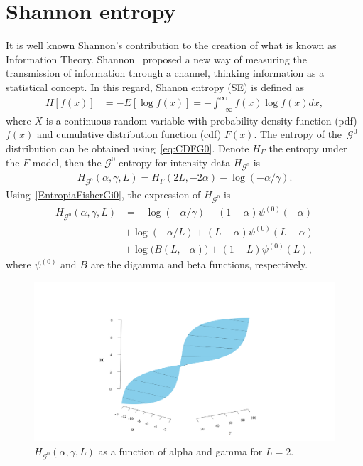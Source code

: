 \documentclass[journal]{IEEEtran}
\begin{document}
	\section{Shannon entropy}
	
	It is well known Shannon's contribution to the creation of what is known as Information Theory. 
	Shannon~\cite{Shannon1948} proposed a new way of
	measuring the transmission of information through a channel, thinking information as a statistical concept. 
	In this regard, Shanon entropy (SE) is defined as
	\begin{align}
		\label{SE}
		H[f(x)]&=-E[\log f(x)]=-\int_{-\infty}^{\infty} f(x) \log f(x) d x,
	\end{align}
	where $X$ is a continuous random variable with probability density function (pdf) $f(x)$ and
	cumulative distribution function (cdf) $F(x)$. 
	The entropy of the~$\mathcal{G}^0$ distribution can be obtained using~\eqref{eq:CDFG0}.
	Denote $H_{F}$ the entropy under the $F$ model, then the $\mathcal{G}^0$ entropy for intensity data $H_{\mathcal G^0}$ is 
	\begin{align}
		\label{EntropiaFisherGi0}
		H_{\mathcal G^0}(\alpha,\gamma,L)=H_{F}(2 L, - 2 \alpha) -\log(-\alpha / \gamma).
	\end{align}
	Using~\eqref{EntropiaFisherGi0}, the
	expression of $H_{\mathcal G^0}$ is
	\begin{align}
		\label{EG0}
		H_{\mathcal G^0}(\alpha,\gamma,L)&=-\log (-\alpha / \gamma)-(1-\alpha ) \psi^{(0)}(-\alpha )\\ \nonumber
		&+\log (-\alpha / L)+ ( L- \alpha ) \psi ^{(0)} ( L- \alpha )\\ \nonumber
		&+\log \big(B(L,-\alpha )\big)+(1-L) \psi^{(0)}(L),
	\end{align}
	where $\psi^{(0)}$ and $B$ are the digamma and beta functions, respectively.
	
	\begin{figure}[hbt]
		\centering    
		\includegraphics[width=0.8\linewidth]{../../../Figures/CISS2021/entropia2.pdf}
		\caption{$H_{\mathcal G^0}(\alpha,\gamma,L)$ as a function of alpha and gamma for $L=2$.\label{figure:HG0}}
	\end{figure}
\end{document}
